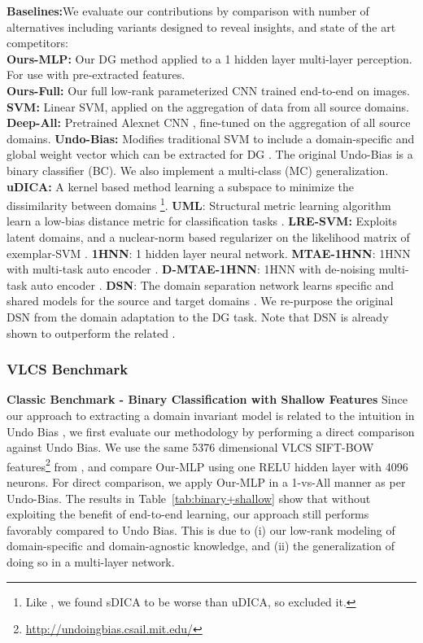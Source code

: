 \documentclass[10pt,twocolumn,letterpaper]{article}
\begin{document}
\vspace{0.1cm}\noindent\textbf{Baselines:}\quad We evaluate our contributions by comparison with number of alternatives including variants designed to reveal insights, and state of the art competitors:\\
\textbf{Ours-MLP:} Our DG method applied to a 1 hidden layer multi-layer perception. For use with pre-extracted features.\\
\textbf{Ours-Full:} Our full low-rank parameterized CNN trained end-to-end on images.
\textbf{SVM:} Linear SVM, applied on the aggregation of data from all source domains. 
\textbf{Deep-All:} Pretrained Alexnet CNN \cite{krizhevsky2012imagenet},  fine-tuned on the aggregation of all source domains. 
\textbf{Undo-Bias:} Modifies traditional SVM to include a domain-specific and global weight vector which can be extracted for DG \cite{ECCV12_Khosla}. The original Undo-Bias is a binary classifier (BC). We also implement a multi-class (MC) generalization. 
\textbf{uDICA:} A kernel based method learning a subspace to minimize the dissimilarity between domains \cite{muandet2013domainGen}\footnote{Like \cite{ghifary2015domain}, we found sDICA to be worse than uDICA, so excluded it.}.
\textbf{UML}:  Structural metric learning algorithm learn a low-bias distance metric for classification tasks \cite{fang2013unbiased}. 
\textbf{LRE-SVM:}  Exploits latent domains, and a nuclear-norm based regularizer on the likelihood matrix of exemplar-SVM \cite{xu2014exploiting}.
\textbf{1HNN}: 1 hidden layer neural network.
\textbf{MTAE-1HNN}: 1HNN with multi-task auto encoder \cite{ghifary2015domain}. \textbf{D-MTAE-1HNN}: 1HNN with de-noising multi-task auto encoder \cite{ghifary2015domain}.
\textbf{DSN}: The domain separation network learns specific and shared models for the source and target domains \cite{bousmalis2016domain}. We re-purpose the original DSN from the domain adaptation to the DG task. Note that DSN is already shown to outperform the related \cite{ganin2015udaBackprop}.




\subsubsection{VLCS Benchmark}
\noindent\textbf{Classic Benchmark - Binary Classification with Shallow Features}\quad
Since our approach to extracting a domain invariant model is related to the intuition in Undo Bias \cite{ECCV12_Khosla}, we first evaluate our methodology by performing a direct comparison against Undo Bias. We use the same 5376 dimensional VLCS SIFT-BOW features\footnote{\url{http://undoingbias.csail.mit.edu/}} from \cite{ECCV12_Khosla}, and compare Our-MLP using one RELU hidden layer with 4096 neurons. For direct comparison, we apply Our-MLP in a 1-vs-All manner as per Undo-Bias. The results in Table~\ref{tab:binary+shallow} show that without exploiting the benefit of end-to-end learning, our approach still performs favorably compared to Undo Bias. This is due to (i) our low-rank modeling of domain-specific and domain-agnostic knowledge, and (ii) the generalization of doing so in a multi-layer network.
\end{document}
